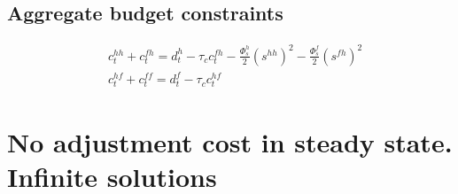 \documentclass[a4paper]{article}
\begin{document}
\subsection{Aggregate budget constraints}
\begin{align}
&c^{hh}_t+c^{fh}_t=d^h_t - \tau_c c^{fh}_t -\frac{\Phi^{h}_s}{2}(s^{hh})^2 - \frac{\Phi^f_s}{2}(s^{fh})^2\\
&c^{hf}_t + c^{ff}_t = d^f_t - \tau_c c^{hf}_t
\end{align}





















\section{No adjustment cost in steady state. Infinite solutions}\label{AdjustmentCost}
\end{document}
